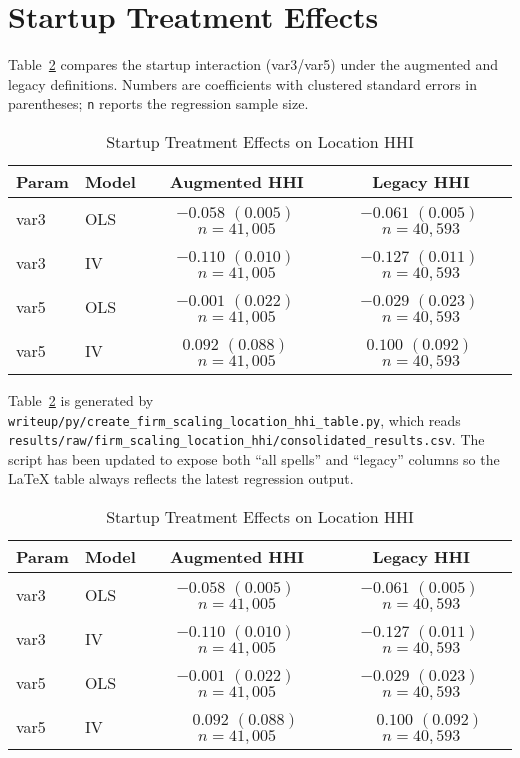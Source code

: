 \documentclass[12pt]{article}
\begin{document}
\section*{Startup Treatment Effects}
Table~\ref{tab:location_hhi_comparison} compares the startup interaction (var3/var5) under the augmented and legacy definitions. Numbers are coefficients with clustered standard errors in parentheses; \texttt{n} reports the regression sample size.
\begin{table}[ht]\centering
\caption{Startup Treatment Effects on Location HHI}
\label{tab:location_hhi_comparison}
\begin{tabular}{llcc}
\toprule
Param & Model & Augmented HHI & Legacy HHI \\
\midrule
var3 & OLS & $-0.058$ $(0.005)$\,$n=41{,}005$ & $-0.061$ $(0.005)$\,$n=40{,}593$ \\
var3 & IV  & $-0.110$ $(0.010)$\,$n=41{,}005$ & $-0.127$ $(0.011)$\,$n=40{,}593$ \\
var5 & OLS & $-0.001$ $(0.022)$\,$n=41{,}005$ & $-0.029$ $(0.023)$\,$n=40{,}593$ \\
var5 & IV  & $0.092$ $(0.088)$\,$n=41{,}005$ & $0.100$ $(0.092)$\,$n=40{,}593$ \\
\bottomrule
\end{tabular}
\end{table}
%
Table~\ref{tab:location_hhi_comparison} is generated by \texttt{writeup/py/create\_firm\_scaling\_location\_hhi\_table.py}, which reads \texttt{results/raw/firm\_scaling\_location\_hhi/consolidated\_results.csv}. The script has been updated to expose both ``all spells'' and ``legacy'' columns so the LaTeX table always reflects the latest regression output.

\begin{table}[ht]\centering
\caption{Startup Treatment Effects on Location HHI}
\label{tab:location_hhi_comparison}
\begin{tabular}{llcc}
\toprule
Param & Model & Augmented HHI & Legacy HHI \\\midrule
var3 & OLS & $-0.058$ $(0.005)$\, $n=41{,}005$ & $-0.061$ $(0.005)$\, $n=40{,}593$ \\
var3 & IV  & $-0.110$ $(0.010)$\, $n=41{,}005$ & $-0.127$ $(0.011)$\, $n=40{,}593$ \\
var5 & OLS & $-0.001$ $(0.022)$\, $n=41{,}005$ & $-0.029$ $(0.023)$\, $n=40{,}593$ \\
var5 & IV  & $\phantom{-}0.092$ $(0.088)$\, $n=41{,}005$ & $\phantom{-}0.100$ $(0.092)$\, $n=40{,}593$ \\
\bottomrule
\end{tabular}
\end{table}
\end{document}

